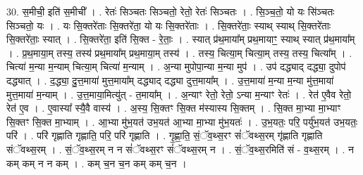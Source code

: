 \documentclass[17pt]{extarticle}
\begin{document}
30. स॒मीची॒ इति॑ स॒मीची᳚ । . रेतः॑ सिञ्चतः सिञ्चतो॒ रेतो॒ रेतः॑ सिञ्चतः । . सि॒ञ्च॒तो॒ यो यः सि॑ञ्चतः सिञ्चतो॒ यः । . यः सि॒क्तरे॑ताः सि॒क्तरे॑ता॒ यो यः सि॒क्तरे॑ताः । . सि॒क्तरे॑ताः॒ स्याथ् स्याथ् सि॒क्तरे॑ताः सि॒क्तरे॑ताः॒ स्यात् । . सि॒क्तरे॑ता॒ इति॑ सि॒क्त - रे॒ताः॒ । . स्यात् प्र॑थ॒माया᳚म् प्रथ॒मायाꣳ॒॒ स्याथ् स्यात् प्र॑थ॒माया᳚म् । . प्र॒थ॒माया॒म् तस्य॒ तस्य॑ प्रथ॒माया᳚म् प्रथ॒माया॒म् तस्य॑ । . तस्य॒ चित्या॒म् चित्या॒म् तस्य॒ तस्य॒ चित्या᳚म् । . चित्या॑ म॒न्या म॒न्याम् चित्या॒म् चित्या॑ म॒न्याम् । . अ॒न्या मुपोपा॒न्या म॒न्या मुप॑ । . उप॑ दद्ध्याद् दद्ध्या॒ दुपोप॑ दद्ध्यात् । . द॒द्ध्या॒ दु॒त्त॒माया॑ मुत्त॒माया᳚म् दद्ध्याद् दद्ध्या दुत्त॒माया᳚म् । . उ॒त्त॒माया॑ म॒न्या म॒न्या मु॑त्त॒माया॑ मुत्त॒माया॑ म॒न्याम् । . उ॒त्त॒माया॒मित्यु॑त् - त॒माया᳚म् । . अ॒न्याꣳ रेतो॒ रेतो॒ ऽन्या म॒न्याꣳ रेतः॑ । . रेत॑ ए॒वैव रेतो॒ रेत॑ ए॒व । . ए॒वास्या᳚ स्यै॒वै वास्य॑ । . अ॒स्य॒ सि॒क्तꣳ सि॒क्त म॑स्यास्य सि॒क्तम् । . सि॒क्त मा॒भ्या मा॒भ्याꣳ सि॒क्तꣳ सि॒क्त मा॒भ्याम् । . आ॒भ्या मु॑भ॒यत॑ उभ॒यत॑ आ॒भ्या मा॒भ्या मु॑भ॒यतः॑ । . उ॒भ॒यतः॒ परि॒ पर्यु॑भ॒यत॑ उभ॒यतः॒ परि॑ । . परि॑ गृह्णाति गृह्णाति॒ परि॒ परि॑ गृह्णाति । . गृ॒ह्णा॒ति॒ सं॒ॅव॒थ्स॒रꣳ सं॑ॅवथ्स॒रम् गृ॑ह्णाति गृह्णाति संॅवथ्स॒रम् । . सं॒ॅव॒थ्स॒रम् न न सं॑ॅवथ्स॒रꣳ सं॑ॅवथ्स॒रम् न । . सं॒ॅव॒थ्स॒रमिति॑ सं - व॒थ्स॒रम् । . न कम् कम् न न कम् । . कम् च॒न च॒न कम् कम् च॒न । \newline
\end{document}
